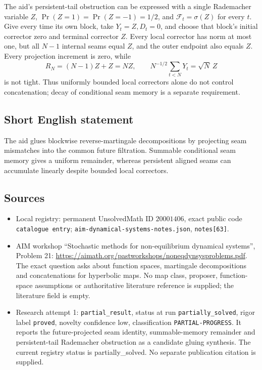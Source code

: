 \documentclass[11pt]{article}
\begin{document}
The aid's persistent-tail obstruction can be expressed with a single Rademacher variable \(Z\), \(\Pr(Z=1)=\Pr(Z=-1)=1/2\), and \(\mathcal F_t=\sigma(Z)\) for every \(t\). Give every time its own block, take \(Y_t=Z,D_t=0\), and choose that block's initial corrector zero and terminal corrector \(Z\). Every local corrector has norm at most one, but all \(N-1\) internal seams equal \(Z\), and the outer endpoint also equals \(Z\). Every projection increment is zero, while
\[
 R_N=(N-1)Z+Z=NZ,\qquad
 N^{-1/2}\sum_{t<N}Y_t=\sqrt N\,Z
\]
is not tight. Thus uniformly bounded local correctors alone do not control concatenation; decay of conditional seam memory is a separate requirement.
\subsection{Short English statement}
The aid glues blockwise reverse-martingale decompositions by projecting seam mismatches into the common future filtration. Summable conditional seam memory gives a uniform remainder, whereas persistent aligned seams can accumulate linearly despite bounded local correctors.
\subsection{Sources}
\begin{itemize}
\item Local registry: permanent UnsolvedMath ID \(20001406\), exact public code \texttt{catalogue entry}; \texttt{aim-dynamical-systems-notes.json}, \texttt{notes[63]}.
\item AIM workshop ``Stochastic methods for non-equilibrium dynamical systems'', Problem 21: \url{https://aimath.org/pastworkshops/noneqdynsysproblems.pdf}. The exact question asks about function spaces, martingale decompositions and concatenations for hyperbolic maps. No map class, proposer, function-space assumptions or authoritative literature reference is supplied; the literature field is empty.
\item Research attempt 1: \texttt{partial\_result}, status at run \texttt{partially\_solved}, rigor label \texttt{proved}, novelty confidence low, classification \texttt{PARTIAL-PROGRESS}. It reports the future-projected seam identity, summable-memory remainder and persistent-tail Rademacher obstruction as a candidate gluing synthesis. The current registry status is partially_solved. No separate publication citation is supplied.
\end{itemize}
\end{document}
